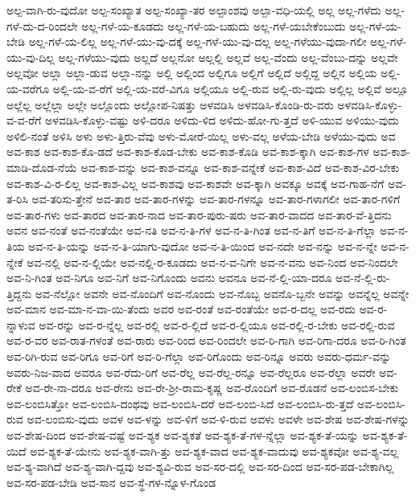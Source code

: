 {ಅಲ್ಪ-ವಾಗಿ-ರು-ವುದೋ
ಅಲ್ಪ-ಸಂಖ್ಯಾತ
ಅಲ್ಪ-ಸಂಖ್ಯಾ-ತರ
ಅಲ್ಪಾಂಶವು
ಅಲ್ಪಾ-ವಧಿ-ಯಲ್ಲಿ
ಅಲ್ಲ
ಅಲ್ಲ-ಗಳೆದು
ಅಲ್ಲ-ಗಳೆ-ದು-ದ-ರಿಂದಲೇ
ಅಲ್ಲ-ಗಳೆ-ಯ-ಕೂಡದು
ಅಲ್ಲ-ಗಳೆ-ಯ-ಬಹುದು
ಅಲ್ಲ-ಗಳೆ-ಯಬೇಕೆಂಬುದು
ಅಲ್ಲ-ಗಳೆ-ಯ-ಬೇಡಿ
ಅಲ್ಲ-ಗಳೆ-ಯ-ಲಿಲ್ಲ
ಅಲ್ಲ-ಗಳೆ-ಯು-ವು-ದಕ್ಕೆ
ಅಲ್ಲ-ಗಳೆ-ಯು-ವು-ದಲ್ಲ
ಅಲ್ಲ-ಗಳೆಯು-ವುದಾ-ಗಲೀ
ಅಲ್ಲ-ಗಳೆ-ಯು-ವು-ದಿಲ್ಲ
ಅಲ್ಲ-ಗಳೆಯು-ವುದು
ಅಲ್ಲದೆ
ಅಲ್ಲನೋ
ಅಲ್ಲಲ್ಲಿ
ಅಲ್ಲವೆ
ಅಲ್ಲ-ವೆಂದು
ಅಲ್ಲ-ವೆಂಬು-ದನ್ನು
ಅಲ್ಲವೇ
ಅಲ್ಲವೋ
ಅಲ್ಲಾ
ಅಲ್ಲಾ-ಡುವ
ಅಲ್ಲಾ-ನನ್ನು
ಅಲ್ಲಿ
ಅಲ್ಲಿಂದ
ಅಲ್ಲಿಗೂ
ಅಲ್ಲಿಗೆ
ಅಲ್ಲಿದೆ
ಅಲ್ಲಿದ್ದ
ಅಲ್ಲಿನ
ಅಲ್ಲಿಯ
ಅಲ್ಲಿ-ಯ-ವರೆಗೂ
ಅಲ್ಲಿ-ಯ-ವ-ರೆಗೆ
ಅಲ್ಲಿ-ಯ-ವರೆ-ವಿಗೂ
ಅಲ್ಲಿಯೂ
ಅಲ್ಲಿ-ರುವ
ಅಲ್ಲಿ-ರು-ವುದು
ಅಲ್ಲಿಲ್ಲ
ಅಲ್ಲಿವೆ
ಅಲ್ಲೂ
ಅಲ್ಲೆಲ್ಲ
ಅಲ್ಲೆಲ್ಲಾ
ಅಲ್ಲೇ
ಅಲ್ಲೊಂದು
ಅಲ್ಲೋಪ-ನಿಷತ್ತು
ಅಳವಡಿಸಿ
ಅಳವಡಿಸಿ-ಕೊಂಡಿ-ರು-ವರು
ಅಳವಡಿಸಿ-ಕೊಳ್ಳು-ವ-ವ-ರೆಗೆ
ಅಳವಡಿಸಿ-ಕೊಳ್ಳು-ವಷ್ಟು
ಅಳಿ-ದರೂ
ಅಳಿದು-ಳಿದ
ಅಳಿದು-ಹೋ-ಗು-ತ್ತದೆ
ಅಳಿ-ಯುವ
ಅಳಿಯು-ವುದು
ಅಳಿಲಿ-ನಂತೆ
ಅಳಿಸಿ
ಅಳು
ಅಳು-ತ್ತಿರು-ವೆವು
ಅಳು-ಮೋರೆ-ಯಿಲ್ಲ
ಅಳು-ವಲ್ಲ
ಅಳೆಯ-ಬೇಡಿ
ಅಳೆಯು-ವುದು
ಅವ
ಅವ-ಕಾಶ
ಅವ-ಕಾಶ-ಕೊ-ಡದೆ
ಅವ-ಕಾಶ-ಕೊಡ-ಬೇಕು
ಅವ-ಕಾಶ-ಕೊಡಿ
ಅವ-ಕಾಶ-ಕ್ಕಾಗಿ
ಅವ-ಕಾಶ-ಗಳ
ಅವ-ಕಾಶ-ಮಾಡಿ-ದೊಡ-ನೆಯೆ
ಅವ-ಕಾಶ-ವನ್ನು
ಅವ-ಕಾಶ-ವನ್ನೂ
ಅವ-ಕಾಶ-ವನ್ನೇಕೆ
ಅವ-ಕಾಶ-ವಿದೆ
ಅವ-ಕಾಶ-ವಿರ-ಬೇಕು
ಅವ-ಕಾಶ-ವಿ-ರ-ಲಿಲ್ಲ
ಅವ-ಕಾಶ-ವಿಲ್ಲ
ಅವ-ಕಾಶವು
ಅವ-ಕಾಶವೇ
ಅವ-ಕ್ಕಾಗಿ
ಅವಕ್ಕೂ
ಅವಕ್ಕೆ
ಅವ-ಗಾಹ-ನೆಗೆ
ಅವ-ತ-ರಿಸಿ
ಅವ-ತರಿಸು-ತ್ತೇನೆ
ಅವ-ತಾರ
ಅವ-ತಾರ-ಗಳನ್ನು
ಅವ-ತಾರ-ಗಳನ್ನೂ
ಅವ-ತಾರ-ಗಳಾಗಲೀ
ಅವ-ತಾರ-ಗಳಿಗೆ
ಅವ-ತಾರ-ಗಳು
ಅವ-ತಾರದ
ಅವ-ತಾರ-ನಾದ
ಅವ-ತಾರ-ಪುರು-ಷರು
ಅವ-ತಾರ-ವಾದದ
ಅವ-ತಾರ-ವೆ-ತ್ತಿದನು
ಅವನ
ಅವ-ನಂತೆ
ಅವ-ನಂತೆಯೇ
ಅವ-ನತಿ
ಅವ-ನ-ತಿ-ಗಳ
ಅವ-ನ-ತಿ-ಗಿಂತ
ಅವ-ನ-ತಿಗೆ
ಅವ-ನ-ತಿ-ಗೆಲ್ಲಾ
ಅವ-ನ-ತಿಯ
ಅವ-ನ-ತಿ-ಯನ್ನು
ಅವ-ನ-ತಿ-ಯಾಗು-ವುದೋ
ಅವ-ನ-ತಿ-ಯಿಂದ
ಅವ-ನದೇ
ಅವ-ನನ್ನು
ಅವ-ನ-ನ್ನೇ
ಅವ-ನ-ನ್ನೇಕೆ
ಅವ-ನಲ್ಲಿ
ಅವ-ನ-ಲ್ಲಿಯೇ
ಅವ-ನಲ್ಲಿ-ರ-ಕೂಡದು
ಅವ-ನ-ವ-ನಿಗೇ
ಅವ-ನ-ವನು
ಅವ-ನಿಂದ
ಅವ-ನಿಂದಲೇ
ಅವ-ನಿ-ಗಿಂತ
ಅವ-ನಿಗೂ
ಅವ-ನಿಗೆ
ಅವ-ನಿಗೊಂದು
ಅವನು
ಅವನೂ
ಅವ-ನೆ-ಲ್ಲಿ-ಯಾ-ದರೂ
ಅವ-ನೆ-ಲ್ಲಿ-ರು-ತ್ತಿದ್ದನು
ಅವ-ನೆಲ್ಲೋ
ಅವನೇ
ಅವ-ನೊಂದಿಗೆ
ಅವ-ನೊಂದು
ಅವ-ನೊಬ್ಬ
ಅವನೊ-ಬ್ಬನೇ
ಅವನ್ನು
ಅವನ್ನೆಲ್ಲ
ಅವನ್ನೇ
ಅವ-ಮಾನ
ಅವ-ಮಾ-ನ-ವಾ-ಯಿ-ತೆಂದು
ಅವರ
ಅವ-ರಂತೆ
ಅವ-ರಂತೆಯೇ
ಅವ-ರ-ದಲ್ಲ
ಅವ-ರದು
ಅವ-ರ-ನ್ನಾಳುವ
ಅವ-ರನ್ನು
ಅವ-ರ-ನ್ನೆಲ್ಲ
ಅವ-ರಲ್ಲಿ
ಅವ-ರ-ಲ್ಲಿದೆ
ಅವ-ರ-ಲ್ಲಿಯೂ
ಅವ-ರಲ್ಲಿ-ರ-ಬೇಕು
ಅವ-ರಲ್ಲಿ-ರುವ
ಅವ-ರ-ವರ
ಅವ-ರಾತ-ಗಳಂತೆ
ಅವ-ರಾರು
ಅವ-ರಿಂದ
ಅವ-ರಿಂದಲೇ
ಅವ-ರಿ-ಗಾಗಿ
ಅವ-ರಿಗಾ-ದರೂ
ಅವ-ರಿ-ಗಿಂತ
ಅವ-ರಿಗಿ-ರುವ
ಅವ-ರಿಗೂ
ಅವ-ರಿಗೆ
ಅವ-ರಿ-ಗೆಲ್ಲಾ
ಅವ-ರಿಗೊಂದು
ಅವ-ರಿನ್ನೂ
ಅವರು
ಅವರು-ಧರ್ಮ-ವನ್ನು
ಅವರು-ನಿಜ-ವಾದ
ಅವರೂ
ಅವ-ರೆದು-ರಿಗೆ
ಅವ-ರೆಲ್ಲ
ಅವ-ರೆಲ್ಲ-ರನ್ನೂ
ಅವ-ರೆಲ್ಲರೂ
ಅವ-ರೆಲ್ಲಾ
ಅವರೇ
ಅವ-ರೇಕೆ
ಅವ-ರೇ-ನಾ-ದರೂ
ಅವ-ರೇನು
ಅವ-ರೇ-ಶ್ರೀ-ರಾಮ-ಕೃಷ್ಣ
ಅವ-ರೊಂದಿಗೆ
ಅವ-ರೊಡನೆ
ಅವ-ಲಂಬಿಸ-ಬೇಕು
ಅವ-ಲಂಬಿಸಿತ್ತೋ
ಅವ-ಲಂಬಿಸಿ-ದಂಥವು
ಅವ-ಲಂಬಿಸಿ-ದರೆ
ಅವ-ಲಂಬಿ-ಸಿದೆ
ಅವ-ಲಂಬಿಸಿ-ರು-ತ್ತದೆ
ಅವ-ಲಂಬಿಸಿ-ರುವ
ಅವ-ಲಂಬಿಸು-ವುದು
ಅವಳ
ಅವ-ಳನ್ನು
ಅವ-ಳಿಗೆ
ಅವ-ಳಿ-ರುವ
ಅವಳು
ಅವಳೇ
ಅವ-ಶೇಷ
ಅವ-ಶೇಷ-ಗಳನ್ನು
ಅವ-ಶೇಷ-ದಿಂದ
ಅವ-ಶೇಷ-ವಷ್ಟೆ
ಅವ-ಶ್ಯಕ
ಅವ-ಶ್ಯಕತೆ
ಅವ-ಶ್ಯಕ-ತೆ-ಗಳ-ನ್ನೆಲ್ಲಾ
ಅವ-ಶ್ಯಕ-ತೆ-ಯನ್ನು
ಅವ-ಶ್ಯಕ-ತೆ-ಯಿದೆ
ಅವ-ಶ್ಯಕ-ತೆ-ಯೇನು
ಅವ-ಶ್ಯಕ-ವಾಗಿ-ತ್ತು
ಅವ-ಶ್ಯಕ-ವಾದ
ಅವ-ಶ್ಯಕ-ವಾದುವು
ಅವ-ಶ್ಯಕವೋ
ಅವ-ಶ್ಯ-ವಲ್ಲ
ಅವ-ಶ್ಯ-ವಾಗಿದೆ
ಅವ-ಶ್ಯ-ವಾಗಿ-ದ್ದವು
ಅವ-ಶ್ಯವಿ-ರುವ
ಅವ-ಸರ-ದಲ್ಲಿ
ಅವ-ಸರ-ದಿಂದ
ಅವ-ಸರ-ಪಡ-ಬೇಕಾಗಿಲ್ಲ
ಅವ-ಸರ-ಪಡ-ಬೇಡಿ
ಅವ-ಸಾನ
ಅವ-ಸ್ಥೆ-ಗಳ-ನ್ನೊಳ-ಗೊಂಡ
}

